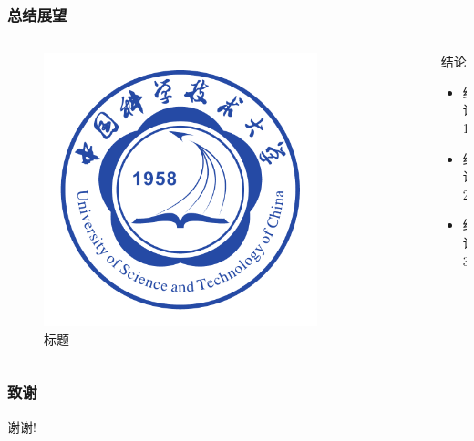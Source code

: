 \documentclass[aspectratio=169]{ctexbeamer}
\begin{document}
\begin{frame}
  \frametitle{总结展望}
  \begin{columns}
    \begin{column}{0.50\textwidth}
      \begin{figure}
        \includegraphics[width=0.8\textwidth]{figures/ustc_logo.pdf}
        \caption{标题}
      \end{figure}
    \end{column}
    \begin{column}{0.50\textwidth}
      \begin{block}{结论}
        \begin{itemize}
          \item 结论 1
          \item 结论 2
          \item 结论 3
        \end{itemize}
      \end{block}
    \end{column}
  \end{columns}
\end{frame}

\begin{frame}
  \frametitle{致谢}
  \centerline{\Large 谢谢!}
\end{frame}
\end{document}
